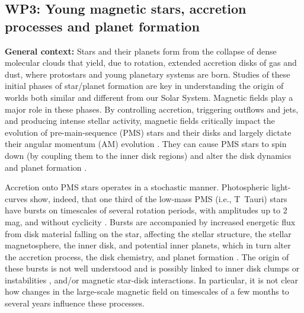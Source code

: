 \documentclass[
    traditabstract,
    longauth,
    onecolumn,
]{aa}
\begin{document}
\subsection{WP3: Young magnetic stars, accretion processes and planet formation}
{\bf General context:}
Stars and their planets form from the collapse of dense molecular clouds that yield, due to rotation, extended accretion disks of gas and dust, where protostars and young planetary systems are born. Studies of these initial phases of star/planet formation are key in understanding the origin of worlds both similar and different from our Solar System. Magnetic fields play a major role in these phases. By controlling accretion, triggering outflows and jets, and producing intense stellar activity, magnetic fields critically impact the evolution of pre-main-sequence (PMS) stars and their disks and largely dictate their angular momentum (AM) evolution \citep{Hartmann_Accretion_2016,Feiden_Magnetic_2016,Amard_Effects_2023}. %
They can cause PMS stars to spin down (by coupling them to the inner disk regions) and alter the disk dynamics and planet formation \citep{Bouvier_Angular_2014,Manara_Demographics_2023}. 

Accretion onto PMS stars operates in a stochastic manner.  
Photospheric light-curves show, indeed, that one third of the low-mass PMS (i.e., T~Tauri) stars have bursts on timescales of several rotation periods, with amplitudes up to 2 mag, and without cyclicity \citep{Cody_Continuum_2017,Herczeg2023}. Bursts are accompanied by increased energetic flux from disk material falling on the star, affecting the stellar structure, the stellar magnetosphere, the inner disk, and potential inner planets, which in turn alter the accretion process, the disk chemistry, and planet formation \citep{Fischer_Accretion_2023}. The origin of these bursts is not well understood and is possibly linked to inner disk clumps or instabilities \citep{Ji2026}, and/or magnetic star-disk interactions. In particular, it is not clear how changes in the large-scale magnetic field on timescales of a few months to several years influence these processes.  %
\end{document}
